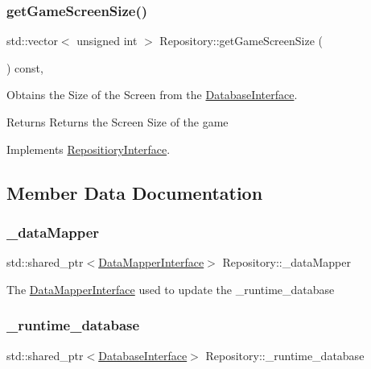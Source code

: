 \subsubsection{\texorpdfstring{get\+Game\+Screen\+Size()}{getGameScreenSize()}}
{\footnotesize\ttfamily std\+::vector$<$ unsigned int $>$ Repository\+::get\+Game\+Screen\+Size (\begin{DoxyParamCaption}{ }\end{DoxyParamCaption}) const\hspace{0.3cm}{\ttfamily [override]}, {\ttfamily [virtual]}}



Obtains the Size of the Screen from the \hyperlink{class_database_interface}{Database\+Interface}. 

\begin{DoxyReturn}{Returns}
Returns the Screen Size of the game 
\end{DoxyReturn}


Implements \hyperlink{class_repositiory_interface_a428e935faa2fd5790cbccc09f1066ef6}{Repositiory\+Interface}.



\subsection{Member Data Documentation}
\mbox{\label{class_repository_a0bcbb13dbddc52d69c4b2d46a7730023}} 
\subsubsection{\texorpdfstring{\+\_\+data\+Mapper}{\_dataMapper}}
{\footnotesize\ttfamily std\+::shared\+\_\+ptr$<$\hyperlink{class_data_mapper_interface}{Data\+Mapper\+Interface}$>$ Repository\+::\+\_\+data\+Mapper\hspace{0.3cm}{\ttfamily [private]}}

The \hyperlink{class_data_mapper_interface}{Data\+Mapper\+Interface} used to update the \+\_\+runtime\+\_\+database \mbox{\label{class_repository_afe9b5f2e11e176745c227276c07bcdcb}} 
\subsubsection{\texorpdfstring{\+\_\+runtime\+\_\+database}{\_runtime\_database}}
{\footnotesize\ttfamily std\+::shared\+\_\+ptr$<$\hyperlink{class_database_interface}{Database\+Interface}$>$ Repository\+::\+\_\+runtime\+\_\+database\hspace{0.3cm}{\ttfamily [private]}}

